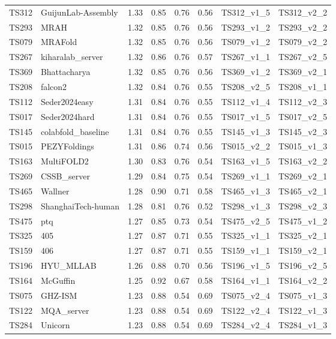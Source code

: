 \begin{table}[ht]
{\begin{tabular}{llllllll}
TS312 & GuijunLab-Assembly & 1.33 & 0.85 & 0.76 & 0.56 & TS312\_v1\_5 & TS312\_v2\_2 \\ 
TS293 & MRAH & 1.32 & 0.85 & 0.76 & 0.56 & TS293\_v1\_2 & TS293\_v2\_2 \\ 
TS079 & MRAFold & 1.32 & 0.85 & 0.76 & 0.56 & TS079\_v1\_2 & TS079\_v2\_2 \\ 
TS267 & kiharalab\_server & 1.32 & 0.86 & 0.76 & 0.57 & TS267\_v1\_1 & TS267\_v2\_5 \\ 
TS369 & Bhattacharya & 1.32 & 0.85 & 0.76 & 0.56 & TS369\_v1\_2 & TS369\_v2\_1 \\ 
TS208 & falcon2 & 1.32 & 0.84 & 0.76 & 0.55 & TS208\_v2\_5 & TS208\_v1\_1 \\ 
TS112 & Seder2024easy & 1.31 & 0.84 & 0.76 & 0.55 & TS112\_v1\_4 & TS112\_v2\_3 \\ 
TS017 & Seder2024hard & 1.31 & 0.84 & 0.76 & 0.55 & TS017\_v1\_5 & TS017\_v2\_5 \\ 
TS145 & colabfold\_baseline & 1.31 & 0.84 & 0.76 & 0.55 & TS145\_v1\_3 & TS145\_v2\_3 \\ 
TS015 & PEZYFoldings & 1.31 & 0.86 & 0.74 & 0.56 & TS015\_v2\_2 & TS015\_v1\_3 \\ 
TS163 & MultiFOLD2 & 1.30 & 0.83 & 0.76 & 0.54 & TS163\_v1\_5 & TS163\_v2\_2 \\ 
TS269 & CSSB\_server & 1.29 & 0.84 & 0.75 & 0.54 & TS269\_v1\_1 & TS269\_v2\_1 \\ 
TS465 & Wallner & 1.28 & 0.90 & 0.71 & 0.58 & TS465\_v1\_3 & TS465\_v2\_1 \\ 
TS298 & ShanghaiTech-human & 1.28 & 0.81 & 0.76 & 0.52 & TS298\_v1\_3 & TS298\_v2\_3 \\ 
TS475 & ptq & 1.27 & 0.85 & 0.73 & 0.54 & TS475\_v2\_5 & TS475\_v1\_2 \\ 
TS325 & 405 & 1.27 & 0.87 & 0.71 & 0.55 & TS325\_v1\_1 & TS325\_v2\_1 \\ 
TS159 & 406 & 1.27 & 0.87 & 0.71 & 0.55 & TS159\_v1\_1 & TS159\_v2\_1 \\ 
TS196 & HYU\_MLLAB & 1.26 & 0.88 & 0.70 & 0.56 & TS196\_v1\_5 & TS196\_v2\_5 \\ 
TS164 & McGuffin & 1.25 & 0.92 & 0.67 & 0.58 & TS164\_v1\_1 & TS164\_v2\_2 \\ 
TS075 & GHZ-ISM & 1.23 & 0.88 & 0.54 & 0.69 & TS075\_v2\_4 & TS075\_v1\_3 \\ 
TS122 & MQA\_server & 1.23 & 0.88 & 0.54 & 0.69 & TS122\_v2\_4 & TS122\_v1\_3 \\ 
TS284 & Unicorn & 1.23 & 0.88 & 0.54 & 0.69 & TS284\_v2\_4 & TS284\_v1\_3 \\ 

\end{tabular}}
\end{table}
